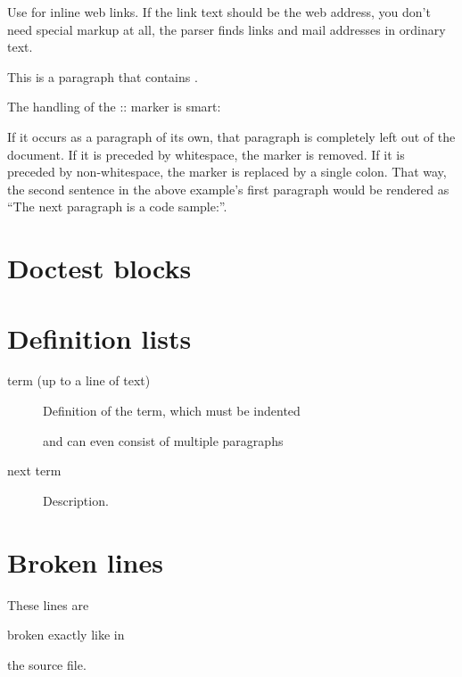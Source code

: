 \documentclass[letterpaper,10pt,english]{sphinxmanual}
\begin{document}
Use  for inline web links. If the link text should be the web address, you don’t need special markup at all, the parser finds links and mail addresses in ordinary text.

This is a paragraph that contains .

The handling of the :: marker is smart:

If it occurs as a paragraph of its own, that paragraph is completely left out of the document.
If it is preceded by whitespace, the marker is removed.
If it is preceded by non-whitespace, the marker is replaced by a single colon.
That way, the second sentence in the above example’s first paragraph would be rendered as “The next paragraph is a code sample:”.


\section{Doctest blocks}
\label{\detokenize{usage/tablas:doctest-blocks}}
\begin{sphinxVerbatim}[commandchars=\\\{\}]
  
\end{sphinxVerbatim}


\section{Definition lists}
\label{\detokenize{usage/tablas:definition-lists}}\begin{description}
\item[{term (up to a line of text)}] \leavevmode
Definition of the term, which must be indented

and can even consist of multiple paragraphs

\item[{next term}] \leavevmode
Description.

\end{description}


\section{Broken lines}
\label{\detokenize{usage/tablas:broken-lines}}
\begin{DUlineblock}{0em}
\item[] These lines are
\item[] broken exactly like in
\item[] the source file.
\end{DUlineblock}
\end{document}
